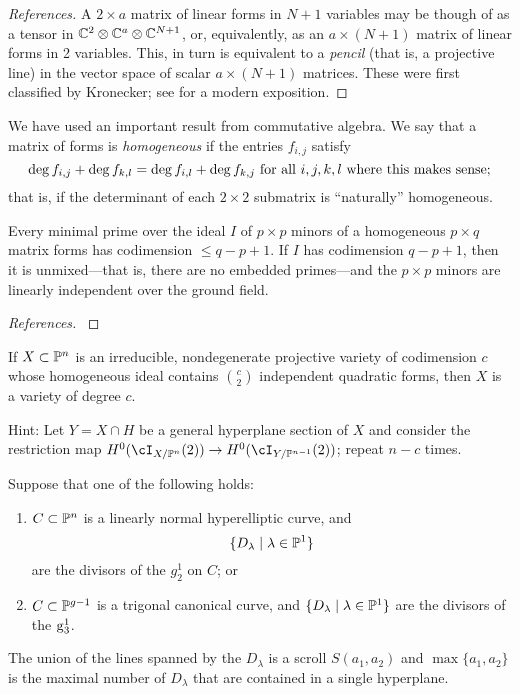 \begin{proof}[References]
A $2\times a$ matrix of linear forms in $N+1$ variables may be though of as a tensor
in $\CC^{2}\otimes \CC^{a}\otimes \CC^{N+1}$, or, equivalently, as an $a\times (N+1)$ matrix of linear forms in 2 variables. This, in turn is equivalent to a \emph{pencil} (that is, a projective line) in the vector space of scalar $a\times (N+1)$ matrices. These were first classified by Kronecker; see 
\cite[Theorems *** and ***]{Gantmacher} for a modern exposition. 
\end{proof}


We have used an important result from commutative algebra.
We say that a matrix of forms is \emph{homogeneous} if the entries $f_{i,j}$ satisfy
$$
\deg f_{i,j} + \deg f_{k,l} = \deg f_{i,l}+\deg f_{k,j} \hbox{ for all } i,j,k,l \hbox{ where this makes sense;}
$$
that is, if the determinant of each $2\times 2$ submatrix is ``naturally'' homogeneous.

\begin{fact}\label{Macaulay's Theorem} Every minimal prime over the ideal $I$ of $p\times p$ minors of a homogeneous $p\times q$ matrix forms has codimension $\leq q-p+1$. If $I$ has codimension $q-p+1$, then it is unmixed---that is, there are no embedded primes---and the $p\times p$ minors are linearly independent over the ground field.
\end{fact}

\begin{proof}[References] 
\cite[ Theorem *** ]{Ei}
\end{proof}

\begin{exercise}\label{many quadrics}
 If $X \subset \PP^n$ is an irreducible, nondegenerate projective variety of codimension $c$ whose homogeneous ideal
 contains ${c\choose 2}$ independent quadratic forms, then $X$ is a variety of degree $c$.
 
Hint: Let $Y = X \cap H$ be a general hyperplane section of $X$ and consider the restriction map $H^0(\cI_{X/\PP^n}(2)) \to H^0(\cI_{Y/\PP^{n-1}}(2))$; repeat $n-c$ times.
\end{exercise}

\begin{corollary}\label{hyperelliptic and trigonal} Suppose that one of the following holds:
\begin{enumerate}
 \item  $C\subset \PP^n$ is a linearly normal hyperelliptic curve, and  
$$
\{D_\lambda \mid \lambda \in \PP^1\}
$$
are the divisors of the $g^1_2$ on $C$; or

\item $C\subset \PP^{g-1}$ is a trigonal canonical curve, and  
$\{D_\lambda \mid \lambda \in \PP^1\}$
are the divisors of the $\g^1_3$.
\end{enumerate}

The union of the lines spanned by the $D_\lambda$
is a scroll $S(a_1,a_2)$ and $\max\{a_1, a_2\}$ is the maximal number of
$D_\lambda$ that are contained in a single hyperplane.
\end{corollary}

